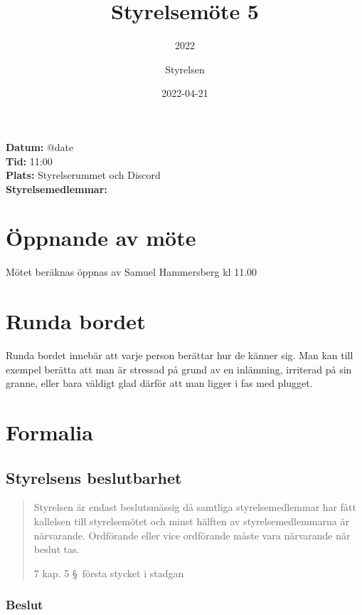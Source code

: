 \documentclass[protokoll]{dvd}
\begin{document}
\title{Styrelsemöte 5}
\subtitle{2022}
\author{Styrelsen}
\date{2022-04-21}

\textbf{Datum:} \csname @date\endcsname\\
\textbf{Tid:} 11:00\\
\textbf{Plats:} Styrelserummet och Discord\\
\textbf{Styrelsemedlemmar:}
\begin{närvarande_förtroendevalda}
\end{närvarande_förtroendevalda}


\section{Öppnande av möte}

Mötet beräknas öppnas av Samuel Hammersberg kl 11.00

\section{Runda bordet}

Runda bordet innebär att varje person berättar hur de känner sig.
Man kan till exempel berätta att man är stressad på grund av en inlämning, irriterad på sin granne, eller bara väldigt glad därför att man ligger i fas med plugget.

\newpage

\section{Formalia}

\subsection{Styrelsens beslutbarhet}

\blockquote[7 kap. 5 \S~första stycket i stadgan][]{%
    Styrelsen är endast beslutsmässig då samtliga styrelsemedlemmar har fått kallelsen till styrelsemötet och minst hälften av styrelsemedlemmarna är närvarande.
    Ordförande eller vice ordförande måste vara närvarande när beslut tas.
}

\subsubsection{Beslut}
\end{document}
